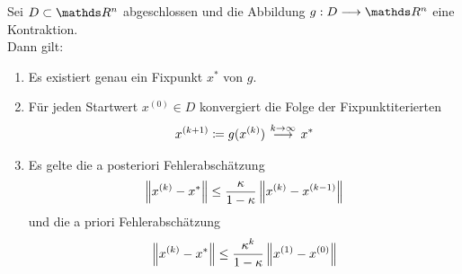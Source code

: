 \begin{Satze}
  \label{5.2.4}
  Sei $D\subset \R^n$ abgeschlossen und die Abbildung $g:D\longrightarrow \R^n$  eine Kontraktion. \\
  Dann gilt:
  \begin{enumerate}[1)]
  \item Es existiert genau ein Fixpunkt $x^{*}$ von $g$.
  \item Für jeden Startwert $x^{(0)}\in D$ konvergiert die Folge der Fixpunktiterierten
    \begin{gather}
      x^{(k+1)} \coloneqq g(x^{(k)})  ~
      \overset{\mathclap{k\rightarrow \infty}}{\longrightarrow}~ x^{*}
      \label{V.2.5}
    \end{gather}
  \item Es gelte die a posteriori Fehlerabschätzung
    \begin{gather}
      \left\| x^{(k)}-x^{*} \right\| \leq \frac{\kappa}{1-\kappa} \left\| x^{(k)}-x^{(k-1)} \right\|
      \label{V.2.6}
    \end{gather}
    und die a priori Fehlerabschätzung
    \begin{gather}
      \left\| x^{(k)}-x^{*} \right\| \leq \frac{\kappa^k}{1-\kappa} \left\| x^{(1)}-x^{(0)}  \right\|
      \label{V.2.7}
    \end{gather}
  \end{enumerate}
\end{Satze}


